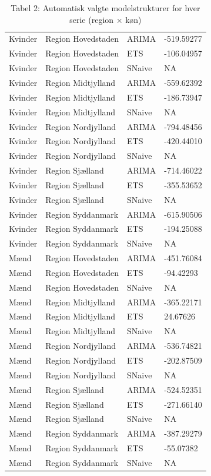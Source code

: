 \documentclass[
]{article}
\begin{document}
\begin{longtable}[t]{llll}
\caption{Tabel 2: Automatisk valgte modelstrukturer for hver serie (region × køn)}\\
\toprule
\cellcolor[HTML]{f0f0f0}{\textbf{kon}} & \cellcolor[HTML]{f0f0f0}{\textbf{region}} & \cellcolor[HTML]{f0f0f0}{\textbf{.model}} & \cellcolor[HTML]{f0f0f0}{\textbf{AICc}}\\
\midrule
Kvinder & Region Hovedstaden & ARIMA & -519.59277\\
Kvinder & Region Hovedstaden & ETS & -106.04957\\
Kvinder & Region Hovedstaden & SNaive & NA\\
Kvinder & Region Midtjylland & ARIMA & -559.62392\\
Kvinder & Region Midtjylland & ETS & -186.73947\\
\addlinespace
Kvinder & Region Midtjylland & SNaive & NA\\
Kvinder & Region Nordjylland & ARIMA & -794.48456\\
Kvinder & Region Nordjylland & ETS & -420.44010\\
Kvinder & Region Nordjylland & SNaive & NA\\
Kvinder & Region Sjælland & ARIMA & -714.46022\\
\addlinespace
Kvinder & Region Sjælland & ETS & -355.53652\\
Kvinder & Region Sjælland & SNaive & NA\\
Kvinder & Region Syddanmark & ARIMA & -615.90506\\
Kvinder & Region Syddanmark & ETS & -194.25088\\
Kvinder & Region Syddanmark & SNaive & NA\\
\addlinespace
Mænd & Region Hovedstaden & ARIMA & -451.76084\\
Mænd & Region Hovedstaden & ETS & -94.42293\\
Mænd & Region Hovedstaden & SNaive & NA\\
Mænd & Region Midtjylland & ARIMA & -365.22171\\
Mænd & Region Midtjylland & ETS & 24.67626\\
\addlinespace
Mænd & Region Midtjylland & SNaive & NA\\
Mænd & Region Nordjylland & ARIMA & -536.74821\\
Mænd & Region Nordjylland & ETS & -202.87509\\
Mænd & Region Nordjylland & SNaive & NA\\
Mænd & Region Sjælland & ARIMA & -524.52351\\
\addlinespace
Mænd & Region Sjælland & ETS & -271.66140\\
Mænd & Region Sjælland & SNaive & NA\\
Mænd & Region Syddanmark & ARIMA & -387.29279\\
Mænd & Region Syddanmark & ETS & -55.07382\\
Mænd & Region Syddanmark & SNaive & NA\\
\bottomrule
\end{longtable}
\end{document}
